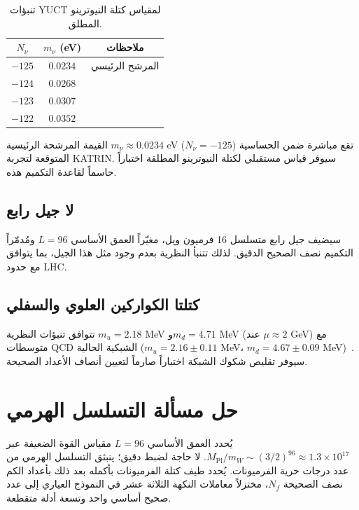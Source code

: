 \documentclass[12pt,a4paper]{article}
\begin{document}
	\begin{otherlanguage}{english}
		\begin{table}[htbp]
			\centering
			\caption{تنبؤات YUCT لمقياس كتلة النيوترينو المطلق.}
			\label{tab:neutrino}
			\begin{tabular}{c c c}
				\toprule
				\(N_\nu\) & \(m_\nu\) (eV) & ملاحظات \\
				\midrule
				\(-125\) & \(0.0234\) & المرشح الرئيسي \\
				\(-124\) & \(0.0268\) & \\
				\(-123\) & \(0.0307\) & \\
				\(-122\) & \(0.0352\) & \\
				\bottomrule
			\end{tabular}
		\end{table}
	\end{otherlanguage}
	
	القيمة المرشحة الرئيسية \(m_\nu \approx 0.0234\) eV (\(N_\nu = -125\)) تقع مباشرة ضمن الحساسية المتوقعة لتجربة KATRIN. سيوفر قياس مستقبلي لكتلة النيوترينو المطلقة اختباراً حاسماً لقاعدة التكميم هذه.
	
	\subsection{لا جيل رابع}
	سيضيف جيل رابع متسلسل 16 فرميون ويل، مغيّراً العمق الأساسي \(L=96\) ومُدمّراً التكميم نصف الصحيح الدقيق. لذلك تتنبأ النظرية بعدم وجود مثل هذا الجيل، بما يتوافق مع حدود LHC.
	
	\subsection{كتلتا الكواركين العلوي والسفلي}
	تتوافق تنبؤات النظرية \(m_u = 2.18\) MeV و\(m_d = 4.71\) MeV (عند \(\mu \approx 2\) GeV) مع متوسطات QCD الشبكية الحالية (\(m_u = 2.16 \pm 0.11\) MeV، \(m_d = 4.67 \pm 0.09\) MeV)~\cite{PDG2024}. سيوفر تقليص شكوك الشبكة اختباراً صارماً لتعيين أنصاف الأعداد الصحيحة.
	
	\section{حل مسألة التسلسل الهرمي}
	يُحدد العمق الأساسي \(L=96\) مقياس القوة الضعيفة عبر \(M_{\mathrm{Pl}}/m_W \sim (3/2)^{96} \approx 1.3\times10^{17}\). لا حاجة لضبط دقيق؛ ينبثق التسلسل الهرمي من عدد درجات حرية الفرميونات. يُحدد طيف كتلة الفرميونات بأكمله بعد ذلك بأعداد الكم نصف الصحيحة \(N_f\)، مختزلاً معاملات النكهة الثلاثة عشر في النموذج العياري إلى عدد صحيح أساسي واحد وتسعة أدلة متقطعة.
	
\end{document}
